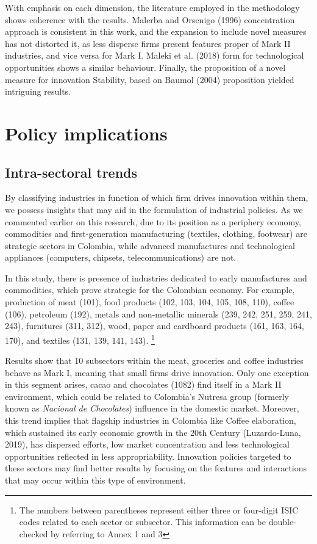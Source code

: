 \documentclass[12pt,a4paper]{article}
\begin{document}
With emphasis on each dimension, the literature employed in the methodology shows coherence with the results. Malerba and Orsenigo (1996) concentration approach is consistent in this work, and the expansion to include novel measures has not distorted it, as less disperse firms present features proper of Mark II industries, and vice versa for Mark I. Maleki et al. (2018) form for technological opportunities shows a similar behaviour. Finally, the proposition of a novel measure for innovation Stability, based on Baumol (2004) proposition yielded intriguing results. 


\section{Policy implications}

\subsection{Intra-sectoral trends}

By classifying industries in function of which firm drives innovation within them, we possess insights that may aid in the formulation of industrial policies. As we commented earlier on this research, due to its position as a periphery economy, commodities and first-generation manufacturing (textiles, clothing, footwear) are strategic sectors in Colombia, while advanced manufactures and technological appliances (computers, chipsets, telecommunications) are not. 

In this study, there is presence of industries dedicated to early manufactures and commodities, which prove strategic for the Colombian economy. For example, production of meat (101), food products (102, 103, 104, 105, 108, 110), coffee (106), petroleum (192), metals and non-metallic minerals (239, 242, 251, 259, 241, 243), furnitures (311, 312), wood, paper and cardboard products (161, 163, 164, 170), and textiles (131, 139, 141, 143). \footnote{The numbers between parentheses represent either three or four-digit ISIC codes related to each sector or subsector. This information can be double-checked by referring to Annex 1 and 3} 

Results show that 10 subsectors within the meat, groceries and coffee industries behave as Mark I, meaning that small firms drive innovation. Only one exception in this segment arises, cacao and chocolates (1082) find itself in a Mark II environment, which could be related to Colombia's Nutresa group (formerly known as \textit{Nacional de Chocolates}) influence in the domestic market. Moreover, this trend implies that flagship industries in Colombia like Coffee elaboration, which sustained its early economic growth in the 20th Century (Luzardo-Luna, 2019), has dispersed efforts, low market concentration and less technological opportunities reflected in less appropriability. Innovation policies targeted to these sectors may find better results by focusing on the features and interactions that may occur within this type of environment. 
\end{document}
